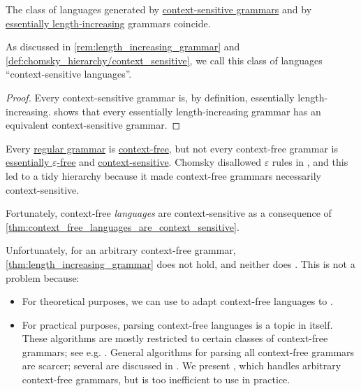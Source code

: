 \begin{proposition}\label{thm:context_sensitive_languages}
  The class of languages generated by \hyperref[def:chomsky_hierarchy/context_sensitive]{context-sensitive grammars} and by \hyperref[def:length_increasing_grammar]{essentially length-increasing} grammars coincide.
\end{proposition}
\begin{comments}
  \item As discussed in \cref{rem:length_increasing_grammar} and \cref{def:chomsky_hierarchy/context_sensitive}, we call this class of languages \enquote{context-sensitive languages}.
\end{comments}
\begin{proof}
  Every context-sensitive grammar is, by definition, essentially length-increasing.  shows that every essentially length-increasing grammar has an equivalent context-sensitive grammar.
\end{proof}

\begin{remark}\label{rem:chomsky_hierarchy_failure}
  Every \hyperref[def:chomsky_hierarchy/regular]{regular grammar} is \hyperref[def:chomsky_hierarchy/context_free]{context-free}, but not every context-free grammar is \hyperref[def:epsilon_free_grammar]{essentially \( \varepsilon \)-free} and \hyperref[def:chomsky_hierarchy/context_sensitive]{context-sensitive}. Chomsky disallowed \( \varepsilon \) rules in \cite[def. 6]{Chomsky1959Grammars}, and this led to a tidy hierarchy because it made context-free grammars necessarily context-sensitive.

  Fortunately, context-free \emph{languages} are context-sensitive as a consequence of \cref{thm:context_free_languages_are_context_sensitive}.

  Unfortunately, for an arbitrary context-free grammar, \cref{thm:length_increasing_grammar} does not hold, and neither does . This is not a problem because:
  \begin{itemize}
    \item For theoretical purposes, we can use  to adapt context-free languages to .

    \item For practical purposes, parsing context-free languages is a topic in itself. These algorithms are mostly restricted to certain classes of context-free grammars; see e.g. \cite[ch. 6]{Salomaa1973FormalLanguages}. General algorithms for parsing all context-free grammars are scarcer; several are discussed in \cite{Economopoulos2006ParsingAlgorithms}. We present , which handles arbitrary context-free grammars, but is too inefficient to use in practice.
  \end{itemize}
\end{remark}

